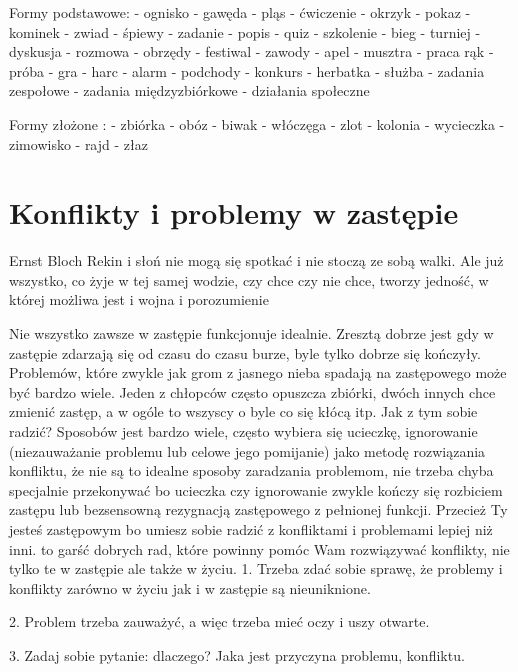 Formy podstawowe:
-  ognisko	-  gawęda	- pląs 		- ćwiczenie
- okrzyk 	-  pokaz		- kominek	- zwiad
-  śpiewy	-  zadanie	- popis		- quiz
-  szkolenie	-  bieg		- turniej		- dyskusja
- rozmowa	-  obrzędy	- festiwal	- zawody
-  apel		-  musztra	- praca rąk	- próba
- gra		- harc		- alarm		-  podchody
- konkurs	- herbatka	- służba
- zadania zespołowe		- zadania międzyzbiórkowe
- działania społeczne			

Formy złożone :
-  zbiórka	-  obóz		-  biwak		-  włóczęga
-  zlot		-  kolonia	-  wycieczka	-  zimowisko
-  rajd		-  złaz


\section{Konflikty i problemy w zastępie}



\begin{aquote}{Ernst Bloch}
Rekin i słoń nie mogą się spotkać i nie stoczą ze sobą walki. Ale już wszystko, co żyje w tej samej wodzie, czy chce czy nie chce, tworzy jedność, w której możliwa jest i wojna i porozumienie
 \end{aquote}


Nie  wszystko  zawsze w  zastępie  funkcjonuje idealnie. 
Zresztą  dobrze  jest  gdy  w  zastępie  zdarzają się od czasu do  czasu burze,  byle tylko  dobrze  się kończyły.  Problemów, które  zwykle  jak  grom z  jasnego nieba spadają na zastępowego może być bardzo wiele. Jeden z chłopców często opuszcza  zbiórki, dwóch innych chce zmienić  zastęp,  a w ogóle to wszyscy o byle co  się kłócą itp.
	Jak z tym sobie radzić?  Sposobów jest bardzo wiele, często wybiera się ucieczkę, ignorowanie (niezauważanie problemu lub celowe jego pomijanie) jako metodę rozwiązania konfliktu, że nie są  to idealne  sposoby  zaradzania  problemom, nie trzeba chyba  specjalnie  przekonywać bo ucieczka czy ignorowanie zwykle kończy się rozbiciem zastępu lub bezsensowną rezygnacją zastępowego z pełnionej funkcji. Przecież Ty jesteś zastępowym bo umiesz sobie radzić z konfliktami  i  problemami lepiej niż inni. to garść dobrych rad, które powinny pomóc Wam rozwiązywać  konflikty, nie tylko te w zastępie ale także w  życiu.
1.
Trzeba zdać sobie sprawę, że problemy i konflikty zarówno w  życiu jak i w zastępie są nieuniknione.

2.
Problem trzeba zauważyć, a więc trzeba mieć oczy i uszy otwarte.

3.
Zadaj sobie pytanie: dlaczego? Jaka jest przyczyna problemu, konfliktu.

